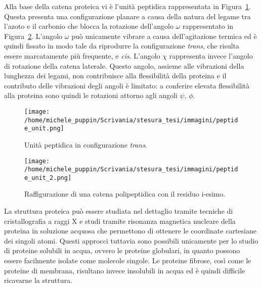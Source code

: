 Alla base della catena proteica vi è l'unità peptidica rappresentata in Figura~\ref{fig:peptide_unit}. Questa presenta una configurazione planare a causa della natura del legame tra l'azoto e il carbonio che blocca la rotazione dell'angolo $ \omega $ rappresentato in Figura~\ref{fig:peptide_unit_2}. L'angolo $ \omega $ può unicamente vibrare a causa dell'agitazione termica ed è quindi fissato in modo tale da riprodurre la configurazione \textit{trans}, che risulta essere marcatamente più frequente, e \textit{cis}. 
L'angolo $ \chi $ rappresenta invece l'angolo di rotazione della catena laterale. Questo angolo, assieme alle vibrazioni della lunghezza dei legami, non contribuisce alla flessibilità della proteina e il contributo delle vibrazioni degli angoli è limitato: a conferire elevata flessibilità alla proteina sono quindi le rotazioni attorno agli angoli $ \psi $, $ \phi $. \cite{protein_physics}
\begin{figure}[h]
	\centering
	\texttt{[image: /home/michele\_puppin/Scrivania/stesura\_tesi/immagini/peptide\_unit.png]}
	\caption{Unità peptidica in configurazione \textit{trans}. \cite{protein_physics}}
	\label{fig:peptide_unit}
\end{figure}

\begin{figure}[h]
	\centering
	\texttt{[image: /home/michele\_puppin/Scrivania/stesura\_tesi/immagini/peptide\_unit\_2.png]}
	\caption{Raffigurazione di una catena polipeptidica con il residuo i-esimo. \cite{protein_physics}}
	\label{fig:peptide_unit_2}
\end{figure}

La struttura proteica può essere studiata nel dettaglio tramite tecniche di cristallografia a raggi X e studi tramite risonanza magnetica nucleare della proteina in soluzione acquosa che permettono di ottenere le coordinate cartesiane dei singoli atomi. Questi approcci tuttavia sono possibili unicamente per lo studio di proteine solubili in acqua, ovvero le proteine globulari, in quanto possono essere facilmente isolate come molecole singole. Le proteine fibrose, così come le proteine di membrana, risultano invece insolubili in acqua ed è quindi difficile ricavarne la struttura. \cite{protein_physics}

